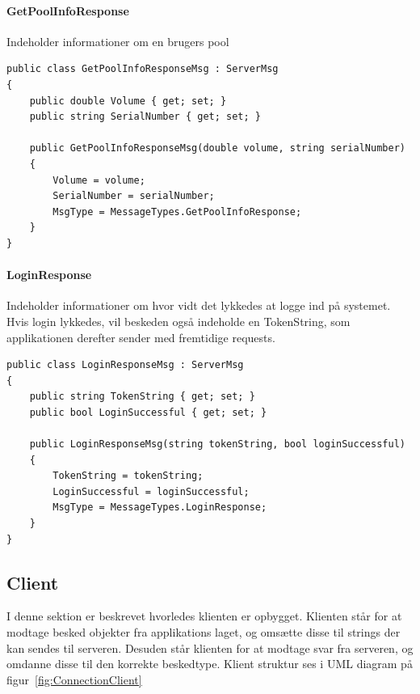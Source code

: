 \paragraph{GetPoolInfoResponse}
Indeholder informationer om en brugers pool
\begin{lstlisting}[caption=GetPoolInfoResponse, label=code:GetPoolInfoResponse]
public class GetPoolInfoResponseMsg : ServerMsg
{
	public double Volume { get; set; }
	public string SerialNumber { get; set; }
	
	public GetPoolInfoResponseMsg(double volume, string serialNumber)
	{
		Volume = volume;
		SerialNumber = serialNumber;
		MsgType = MessageTypes.GetPoolInfoResponse;
	}
}
\end{lstlisting}

\paragraph{LoginResponse}
Indeholder informationer om hvor vidt det lykkedes at logge ind på systemet. Hvis login lykkedes, vil beskeden også indeholde en TokenString, som applikationen derefter sender med fremtidige requests.
\begin{lstlisting}[caption=LoginResponse, label=code:LoginResponse]
public class LoginResponseMsg : ServerMsg
{
	public string TokenString { get; set; }
	public bool LoginSuccessful { get; set; }
	
	public LoginResponseMsg(string tokenString, bool loginSuccessful)
	{
		TokenString = tokenString;
		LoginSuccessful = loginSuccessful;
		MsgType = MessageTypes.LoginResponse;
	}
}
\end{lstlisting}

\subsection{Client}
I denne sektion er beskrevet hvorledes klienten er opbygget. Klienten står for at modtage besked objekter fra applikations laget, og omsætte disse til strings der kan sendes til serveren. Desuden står klienten for at modtage svar fra serveren, og omdanne disse til den korrekte beskedtype. Klient struktur ses i UML diagram på figur~\ref{fig:ConnectionClient}

